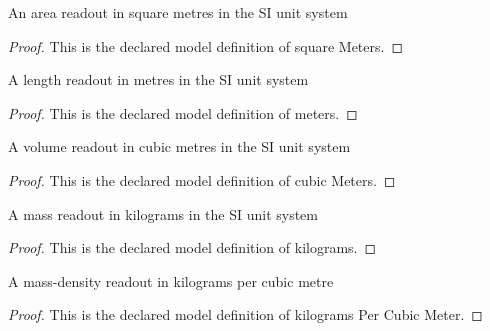 \begin{definition}
  \label{def:physics:phyx-mini-0386:phyxminiproblems-problemphyxmini0386-squaremeters}
  An area readout in square metres in the SI unit system
\end{definition}
\begin{proof}
  This is the declared model definition of square Meters.
\end{proof}
\begin{definition}[meters]
  \label{def:physics:phyx-mini-0386:phyxminiproblems-problemphyxmini0386-meters}
  A length readout in metres in the SI unit system
\end{definition}
\begin{proof}
  This is the declared model definition of meters.
\end{proof}
\begin{definition}
  \label{def:physics:phyx-mini-0386:phyxminiproblems-problemphyxmini0386-cubicmeters}
  A volume readout in cubic metres in the SI unit system
\end{definition}
\begin{proof}
  This is the declared model definition of cubic Meters.
\end{proof}
\begin{definition}[kilograms]
  \label{def:physics:phyx-mini-0386:phyxminiproblems-problemphyxmini0386-kilograms}
  A mass readout in kilograms in the SI unit system
\end{definition}
\begin{proof}
  This is the declared model definition of kilograms.
\end{proof}
\begin{definition}
  \label{def:physics:phyx-mini-0386:phyxminiproblems-problemphyxmini0386-kilogramspercubicmeter}
  A mass-density readout in kilograms per cubic metre
\end{definition}
\begin{proof}
  This is the declared model definition of kilograms Per Cubic Meter.
\end{proof}
